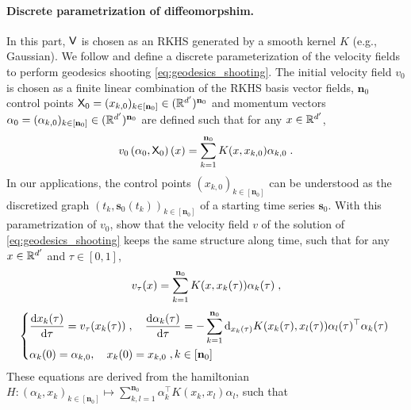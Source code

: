 \paragraph{Discrete parametrization of diffeomorpshim.}

In this part, $\mathsf{V}$ is chosen as an RKHS \cite{berlinet2011reproducing} generated by a smooth kernel $K$ (e.g., Gaussian). 
We follow \cite{durrleman2013sparse} and define a 
 discrete parameterization of the velocity fields to perform geodesics shooting \eqref{eq:geodesics_shooting}.  
  The initial velocity field $v_0$ is chosen as a finite linear combination of the RKHS basis vector fields, 
$\mathbf{n}_0$ control points $\mathsf{X}_0=(x_{k,0})_{k\in[\mathbf{n}_0]}\in (\mathbb{R}^{d'})^{\mathbf{n}_0}$ and momentum vectors $\alpha_0=(\alpha_{k,0})_{k\in[\mathbf{n}_0]}\in (\mathbb{R}^{d'})^{\mathbf{n}_0} $ are defined such that for any $x\in \mathbb{R}^{d'}$, 
  \begin{equation}
    \label{eq:def_v0}
    v_0\left(\alpha_0,\mathsf{X}_0\right)(x)=\sum_{k=1}^{\mathbf{n}_0} K(x,x_{k,0})\alpha_{k,0} \; .
  \end{equation}
   In our applications, the control points $(x_{k,0})_{k\in[\mathbf{n}_0]}$ can be understood as the discretized graph $(t_k,\mathbf{s}_0(t_k))_{k\in[\mathbf{n}_0]}$ of a starting time series $\mathbf{s}_0$. 
  With this parametrization of $v_0$, \cite{miller2006geodesic} show that the velocity field $v$ of the solution of \eqref{eq:geodesics_shooting} keeps the same
  structure along time, such that for any $x\in\mathbb{R}^{d'}$ and $\tau\in[0,1]$, 
  \begin{equation}
    \label{eq:specific_form}
    v_\tau(x)=\sum_{k=1}^{\mathbf{n}_0} K(x,x_k(\tau))\alpha_{k}(\tau) \; ,
  \end{equation}
  \begin{equation} 
    \label{eq:integration}
      \left\{
        \begin{aligned}
        & \frac{\mathop{}\!\mathrm{d} x_k(\tau)}{\mathop{}\!\mathrm{d} \tau}=v_\tau(x_k(\tau)) \;, \quad
        \frac{\mathop{}\!\mathrm{d} \alpha_k(\tau)}{\mathop{}\!\mathrm{d} \tau}=-\sum_{k=1}^{\mathbf{n}_0} \mathop{}\!\mathrm{d}_{x_k(\tau)} K(x_k(\tau),x_l(\tau))\alpha_{l}(\tau)^\top \alpha_{k}(\tau) \;  \\
        & \alpha_k(0)=\alpha_{k,0},\quad x_k(0)=x_{k,0} \; , k\in[\mathbf{n}_0] 
        \end{aligned}
        \right .
  \end{equation}
  These equations are derived from the hamiltonian $H:(\alpha_k,x_k)_{k\in [\mathbf{n}_0]}\mapsto \sum_{k,l=1}^{\mathbf{n}_0} \alpha_{k}^\top K(x_k,x_l)\alpha_{l}  $, such that
